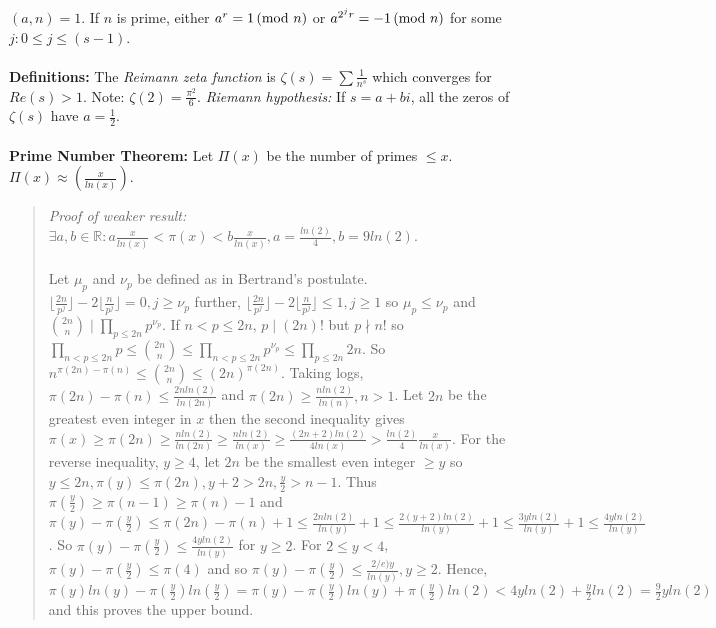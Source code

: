 $(a,n)=1$.  If $n$ is prime, either $a^r = 1 \thinspace \textnormal{(mod } n \textnormal{)}$ or
$a^{2^j r} = -1 \thinspace \textnormal{(mod } n \textnormal{)}$ for some $j: 0 \leq j \leq (s-1)$.
\\
\\
{\bf Definitions:}  The 
\emph{Reimann zeta function} is $\zeta (s)= \sum {\frac {1} {n^s}}$
which converges for $Re(s)>1$.
Note: $\zeta (2) = {\frac {\pi^2} {6}}$.
\emph{Riemann hypothesis:} If $s= a+bi$,
all the zeros of $\zeta (s)$ have $a= {\frac 1 2}$.
\\
\\
{\bf Prime Number Theorem:}  Let $\Pi(x)$ be the number of primes $\leq x$.
$\Pi(x) \approx ({\frac {x} {ln(x)}})$.
\begin{quote}
\emph{Proof of weaker result:}  $\exists a, b \in {\mathbb R}: 
a{\frac x {ln(x)}} < \pi(x) < b{\frac x {ln(x)}}, 
a= {\frac {ln(2)} 4}, b= 9 ln(2) $.
\\
\\
Let $\mu_p$ and $\nu_p$ be defined as in Bertrand's postulate.
$\lfloor {\frac {2n} {p^j}} \rfloor - 2 \lfloor {\frac {n} {p^j}} \rfloor = 0, j \ge \nu_p$
further,
$\lfloor {\frac {2n} {p^j}} \rfloor - 2 \lfloor {\frac {n} {p^j}}\rfloor \leq 1, j \geq 1$ so
$\mu_p \le \nu_p$ and ${2n \choose n} \mid \prod_{p \leq 2n} p^{\nu_p}$.
If $n < p \leq 2n$, $p \mid (2n)!$ but $p \nmid n!$ so
$\prod_{n<p \leq 2n} p \leq {2n \choose n} \leq \prod_{n<p \leq 2n} p^{\nu_p} \leq
\prod_{p \leq 2n} 2n$.   So
$n^{\pi(2n)-\pi(n)} \leq {2n \choose n} \leq (2n)^{\pi(2n)}$.  Taking logs,
$\pi(2n) - \pi(n) \leq {\frac {2n ln(2)} {ln(2n)}}$ and 
$\pi(2n) \geq {\frac {n ln(2)} {ln(n)}}, n>1$.  Let $2n$ be the greatest even integer
in $x$ then the second inequality gives
$\pi(x) \geq \pi(2n) \geq {\frac {n ln(2)}{ln(2n)}} 
\geq {\frac {n ln(2)}{ln(x)}} \geq
{\frac {(2n+2) ln(2)} {4 ln(x)}} > {\frac {ln(2)} 4} {\frac x {ln(x)}}$.
For the reverse inequality, $y \geq 4$, let $2n$ be the smallest even integer $\geq y$ so
$y \leq 2n, \pi(y) \leq \pi(2n), y+2 > 2n, {\frac y 2}>n-1$.  Thus
$\pi({\frac y 2}) \geq \pi(n-1) \geq \pi(n)-1$ and
$\pi(y) - \pi ({\frac y 2}) \leq \pi(2n)-\pi(n)+1 
\leq {\frac {2n ln(2)}{ln(y)}}+1 \leq {\frac {2(y+2) ln(2)}{ln(y)}}+1
\leq {\frac {3y ln(2)}{ln(y)}}+1 \leq {\frac {4y ln(2)}{ln(y)}}$.
So $\pi(y) - \pi ({\frac y 2}) \leq {\frac {4y ln(2)}{ln(y)}}$ for $y \geq 2$.
For $2 \leq y <4$,
$\pi(y)-\pi({\frac y 2}) \leq \pi(4)$ and so
$\pi(y)-\pi({\frac y 2}) \leq {\frac {2/e)y} {ln(y)}}, y \geq 2$.
Hence,
$
\pi(y) ln(y) -\pi({\frac y 2}) ln({\frac y 2})=
\pi(y) - \pi({\frac y 2}) ln(y)+ \pi({\frac y 2}) ln(2) <
4y ln(2) + {\frac y 2} ln(2) = {\frac 9 2} y ln(2)$ and this proves the upper bound.
\end{quote}
